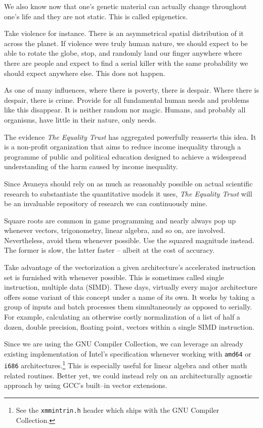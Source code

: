 We also know now that one's genetic material can actually change throughout one's life and they are not static. This is called epigenetics.

Take violence for instance. There is an asymmetrical spatial distribution of it across the planet. If violence were truly human nature, we should expect to be able to rotate the globe, stop, and randomly land our finger anywhere where there are people and expect to find a serial killer with the same  probability we should expect anywhere else. This does not happen. 

As one of many influences, where there is poverty, there is despair. Where there is despair, there is crime. Provide for all fundamental human needs and problems like this disappear. It is neither random nor magic. Humans, and probably all organisms, have little in their nature, only needs.

The evidence {\it The Equality Trust} has aggregated powerfully reasserts this idea. It is a non-profit organization that aims to reduce income inequality through a programme of public and political education designed to achieve a widespread understanding of the harm caused by income inequality.

Since Avaneya should rely on as much as reasonably possible on actual scientific research to substantiate the quantitative models it uses, {\it The Equality Trust} will be an invaluable repository of research we can continuously mine.

Square roots are common in game programming and nearly always pop up whenever vectors, trigonometry, linear algebra, and so on, are involved. Nevertheless, avoid them whenever possible. Use the squared magnitude instead. The former is slow, the latter faster -- albeit at the cost of accuracy.

Take advantage of the vectorization a given architecture's accelerated instruction set is furnished with whenever possible. This is sometimes called single instruction, multiple data (SIMD). These days, virtually every major architecture offers some variant of this concept under a name of its own. It works by taking a group of inputs and batch processes them simultaneously as opposed to serially. For example, calculating an otherwise costly normalization of a list of half a dozen, double precision, floating point, vectors within a single SIMD instruction.

Since we are using the GNU Compiler Collection, we can leverage an already existing implementation of Intel's specification whenever working with {\tt amd64} or {\tt i686} architectures.\footnote{See the {\tt xmmintrin.h} header which ships with the GNU Compiler Collection.} This is especially useful for linear algebra and other math related routines. Better yet, we could instead rely on an architecturally agnostic approach by using GCC's built--in vector extensions.

